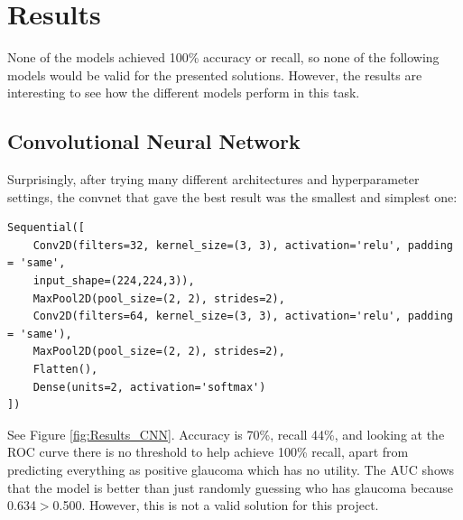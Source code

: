 \documentclass[11pt, a4paper]{article}
\begin{document}
\section{Results}
None of the models achieved 100\% accuracy or recall, so none of the following models would be valid for the presented solutions. However, the results are interesting to see how the different models perform in this task.

\subsection{Convolutional Neural Network}
Surprisingly, after trying many different architectures and hyperparameter settings, the convnet that gave the best result was the smallest and simplest one:
\begin{verbatim}
Sequential([
    Conv2D(filters=32, kernel_size=(3, 3), activation='relu', padding = 'same', 
    input_shape=(224,224,3)),
    MaxPool2D(pool_size=(2, 2), strides=2),
    Conv2D(filters=64, kernel_size=(3, 3), activation='relu', padding = 'same'),
    MaxPool2D(pool_size=(2, 2), strides=2),
    Flatten(),
    Dense(units=2, activation='softmax')
])
\end{verbatim}
See Figure \ref{fig:Results_CNN}. Accuracy is 70\%, recall 44\%, and looking at the ROC curve there is no threshold to help achieve 100\% recall, apart from predicting everything as positive glaucoma which has no utility. The AUC shows that the model is better than just randomly guessing who has glaucoma because 0.634$>$0.500. However, this is not a valid solution for this project.
\end{document}
